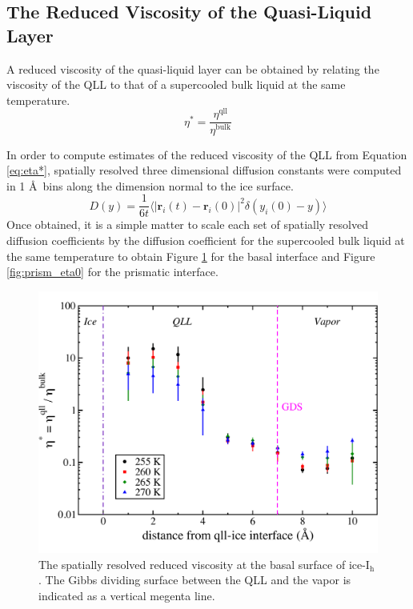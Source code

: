 \subsection{The Reduced Viscosity of the Quasi-Liquid Layer}
A reduced viscosity of the quasi-liquid layer can be obtained by
relating the viscosity of the QLL to that of a supercooled bulk
liquid at the same temperature.
\begin{equation}\label{eq:eta*}
\eta^* = \frac{\eta^{\mathrm{qll}}}{\eta^{\mathrm{bulk}}}
\end{equation}

In order to compute estimates of the reduced viscosity of the QLL from
Equation \eqref{eq:eta*}, spatially resolved three dimensional
diffusion constants were computed in 1 \AA~bins along the dimension
normal to the ice surface.
\begin{equation}\label{eq:yDiff}
D(y) = \frac{1}{6t} \langle | \mathbf{r}_i(t) - \mathbf{r}_i(0) |^2
\delta(y_i(0) - y)  \rangle 
\end{equation}
Once obtained, it is a simple matter to scale each set of spatially
resolved diffusion coefficients by the diffusion coefficient for the
supercooled bulk liquid at the same temperature to obtain Figure
\ref{fig:basal_eta0} for the basal interface and Figure
\ref{fig:prism_eta0} for the prismatic interface. 

\begin{figure}
\includegraphics[width=\linewidth]{Figures/basal_eta0}
\caption{\label{fig:basal_eta0}The spatially resolved reduced
  viscosity at the basal surface of ice-I$_\mathrm{h}$. The Gibbs
  dividing surface between the QLL and the vapor is indicated as a
  vertical megenta line.}
\end{figure}                

